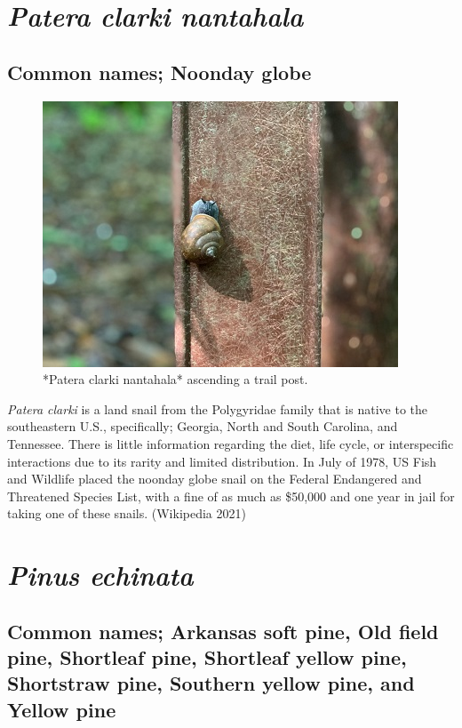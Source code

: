 \documentclass[
]{article}
\begin{document}
\hypertarget{patera-clarki-nantahala}{%
\section{\texorpdfstring{\emph{Patera clarki nantahala}}{Patera clarki nantahala}}\label{patera-clarki-nantahala}}

\hypertarget{common-names-noonday-globe}{%
\subsection{Common names; Noonday globe}\label{common-names-noonday-globe}}

\begin{figure}

{\centering \includegraphics[width=0.5\linewidth]{snail} 

}

\caption{*Patera clarki nantahala* ascending a trail post.}\label{fig:snaily}
\end{figure}

\emph{Patera clarki} is a land snail from the Polygyridae family that is native to the southeastern U.S., specifically; Georgia, North and South Carolina, and Tennessee. There is little information regarding the diet, life cycle, or interspecific interactions due to its rarity and limited distribution. In July of 1978, US Fish and Wildlife placed the noonday globe snail on the Federal Endangered and Threatened Species List, with a fine of as much as \$50,000 and one year in jail for taking one of these snails. (Wikipedia 2021)

\hypertarget{pinus-echinata}{%
\section{\texorpdfstring{\emph{Pinus echinata}}{Pinus echinata}}\label{pinus-echinata}}

\hypertarget{common-names-arkansas-soft-pine-old-field-pine-shortleaf-pine-shortleaf-yellow-pine-shortstraw-pine-southern-yellow-pine-and-yellow-pine}{%
\subsection{Common names; Arkansas soft pine, Old field pine, Shortleaf pine, Shortleaf yellow pine, Shortstraw pine, Southern yellow pine, and Yellow pine}\label{common-names-arkansas-soft-pine-old-field-pine-shortleaf-pine-shortleaf-yellow-pine-shortstraw-pine-southern-yellow-pine-and-yellow-pine}}
\end{document}
